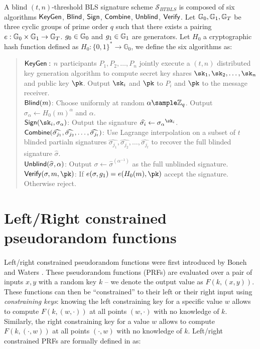 \begin{definition}\label{def:BTBLS} A blind $(t,n)$-threshold BLS signature scheme $\mathcal{S}_{BTBLS}$ is composed of six algorithms $\mathsf{KeyGen}$, $\mathsf{Blind}$, $\mathsf{Sign}$, $\mathsf{Combine}$, $\mathsf{Unblind}$, $\mathsf{Verify}$. Let $\mathbb{G}_0, \mathbb{G}_1, \mathbb{G}_T$ be three cyclic groups of prime order $q$ such that there exists a pairing $e : \mathbb{G}_0 \times \mathbb{G}_1 \rightarrow \mathbb{G}_T$. $g_0 \in \mathbb{G}_0$ and $g_1 \in \mathbb{G}_1$ are generators. Let $H_0$ a cryptographic hash function defined as $H_0: \{0,1\}^* \rightarrow \mathbb{G}_0$, we define the six algorithms as:
	
	\begin{quote}
		$\mathsf{KeyGen}:$ $n$ participants $P_1, P_2, \dots, P_n$ jointly execute a $(t,n)$ distributed key generation algorithm to compute secret key shares $\sk_1, \sk_2, \dots, \sk_n$ and public key $\pk$. Output $\sk_i$ and $\pk$ to $P_i$ and $\pk$ to the message receiver.\\
		$\mathsf{Blind}(m)$: Choose uniformly at random $\alpha \sample \mathbb{Z}_q$. Output $\sigma_\alpha \leftarrow H_0(m)^\alpha$ and $\alpha$. \\
		$\Sign(\sk_i, \sigma_\alpha)$: Output the signature $\widehat{\sigma_i} \leftarrow {\sigma_\alpha}^{\sk_i}$. \\
		$\mathsf{Combine}(\widehat{\sigma_{j_1}}, \widehat{\sigma_{j_2}}, \dots, \widehat{\sigma_{j_t}})$: Use Lagrange interpolation on a subset of $t$ blinded partialn signatures $\widehat{\sigma_{j_1}}, \widehat{\sigma_{j_2}}, \dots, \widehat{\sigma_{j_t}}$ to recover the full blinded signature $\widehat \sigma$. \\
		$\mathsf{Unblind}(\widehat \sigma, \alpha)$: Output $\sigma \leftarrow \widehat \sigma^{(\alpha^{-1})} $ as the full unblinded signature. \\
		$\Verif(\sigma, m, \pk)$: If $e(\sigma, g_1) = e(H_0(m), \pk)$ accept the signature. Otherwise reject.
	\end{quote}
	
\end{definition}




\section{Left/Right constrained pseudorandom functions}

\paragraph{} Left/right constrained pseudorandom functions were first introduced by Boneh and Waters \cite{LRPRF}. These pseudorandom functions (PRFs) are evaluated over a pair of inputs $x,y$ with a random key $k$ -- we denote the output value as $F(k, (x,y))$. These functions can then be ``constrained'' to their left or their right input using \textit{constraining keys}: knowing the left constraining key for a specific value $w$ allows to compute $F(k, (w,\cdot))$ at all points $(w, \cdot)$ with no knowledge of $k$. Similarly, the right constraining key for a value $w$ allows to compute $F(k, (\cdot,w))$ at all points $(\cdot,w)$ with no knowledge of $k$. Left/right constrained PRFs are formally defined in \cite{LRPRF} as:

